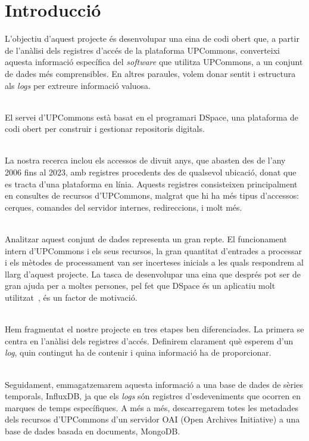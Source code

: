 \chapter*{Introducció}\label{ch:introduction}

L'objectiu d'aquest projecte és desenvolupar una eina de codi obert que, a partir de l'anàlisi dels registres d'accés de la plataforma \gls{UPCommons}, converteixi aquesta informació específica del \textit{software} que utilitza \gls{UPCommons}, a un conjunt de dades més comprensibles.
En altres paraules, volem donar sentit i estructura als \textit{\gls{log}s} per extreure informació valuosa.

\noindent \\
El servei d'\gls{UPCommons} està basat en el programari \gls{DSpace}, una plataforma de codi obert per construir i gestionar repositoris digitals.

\noindent \\
La nostra recerca inclou els accessos de divuit anys, que abasten des de l'any 2006 fins al 2023, amb registres procedents des de qualsevol ubicació, donat que es tracta d'una plataforma en línia.
Aquests registres consisteixen principalment en consultes de recursos d'\gls{UPCommons}, malgrat que hi ha més tipus d'accessos: cerques, comandes del servidor internes, redireccions, i molt més.

\noindent \\
Analitzar aquest conjunt de dades representa un gran repte.
El funcionament intern d'\gls{UPCommons} i els seus recursos, la gran quantitat d'entrades a processar i els mètodes de processament van ser incerteses inicials a les quals respondrem al llarg d'aquest projecte.
La tasca de desenvolupar una eina que després pot ser de gran ajuda per a moltes persones, pel fet que \gls{DSpace} és un aplicatiu molt utilitzat~\cite{eprints:roar}, és un factor de motivació.

\noindent \\
Hem fragmentat el nostre projecte en tres etapes ben diferenciades.
La primera se centra en l'anàlisi dels registres d'accés.
Definirem clarament què esperem d'un \textit{\gls{log}}, quin contingut ha de contenir i quina informació ha de proporcionar.

\noindent \\
Seguidament, emmagatzemarem aquesta informació a una base de dades de sèries temporals, InfluxDB, ja que els \textit{\gls{log}s} són registres d'esdeveniments que ocorren en marques de temps específiques.
A més a més, descarregarem totes les metadades dels recursos d'\gls{UPCommons} d'un servidor OAI (Open Archives Initiative) a una base de dades basada en documents, MongoDB.

